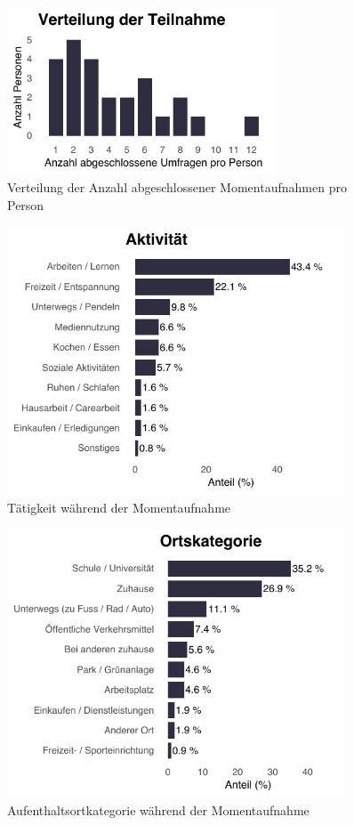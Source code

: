 \begin{figure}[h]
    \centering
    \includegraphics[width=8cm]{Analyse/Plots/survey_counts.pdf}
    \caption{Verteilung der Anzahl abgeschlossener Momentaufnahmen pro Person}
    \label{fig:survey_counts}
\end{figure}

\begin{figure}[h]
    \centering
    \includegraphics[width=10cm]{Analyse/Plots/cat_dist_activity.pdf}
    \caption{Tätigkeit während der Momentaufnahme}
    \label{fig:survey_activities}
\end{figure}

\begin{figure}[h]
    \centering
    \includegraphics[width=10cm]{Analyse/Plots/cat_dist_location_category.pdf}
    \caption{Aufenthaltsortkategorie während der Momentaufnahme}
    \label{fig:survey_locations}
\end{figure}


